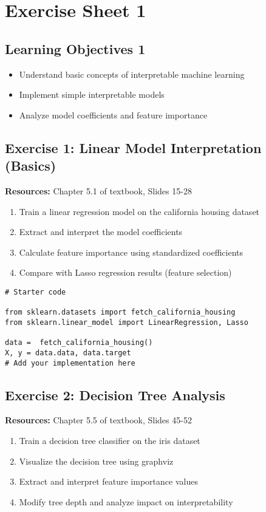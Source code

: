 \chapter*{Exercise Sheet 1}
\section*{Learning Objectives 1}
\begin{itemize}
\item Understand basic concepts of interpretable machine learning
\item Implement simple interpretable models
\item Analyze model coefficients and feature importance
\end{itemize}

\section*{Exercise 1: Linear Model Interpretation (Basics)}
\textbf{Resources:} Chapter 5.1 of textbook, Slides 15-28

\begin{enumerate}
\item Train a linear regression model on the california housing dataset
\item Extract and interpret the model coefficients
\item Calculate feature importance using standardized coefficients
\item Compare with Lasso regression results (feature selection)
\end{enumerate}

\begin{verbatim}
# Starter code

from sklearn.datasets import fetch_california_housing
from sklearn.linear_model import LinearRegression, Lasso

data =  fetch_california_housing()
X, y = data.data, data.target
# Add your implementation here
\end{verbatim}

\section*{Exercise 2: Decision Tree Analysis}
\textbf{Resources:} Chapter 5.5 of textbook, Slides 45-52

\begin{enumerate}
\item Train a decision tree classifier on the iris dataset
\item Visualize the decision tree using graphviz
\item Extract and interpret feature importance values
\item Modify tree depth and analyze impact on interpretability
\end{enumerate}

